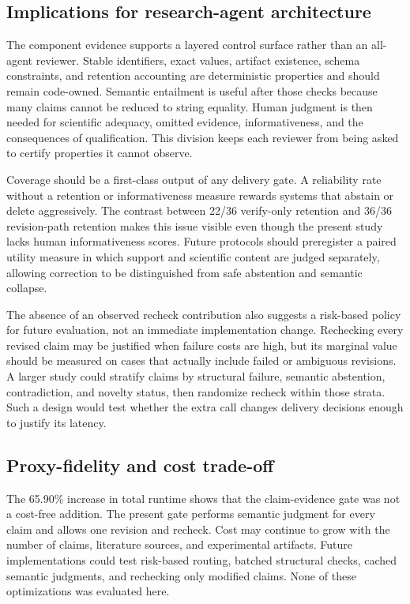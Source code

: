 \documentclass[11pt]{article}
\begin{document}
\subsection{Implications for research-agent architecture}

The component evidence supports a layered control surface rather than an all-agent reviewer. Stable identifiers, exact values, artifact existence, schema constraints, and retention accounting are deterministic properties and should remain code-owned. Semantic entailment is useful after those checks because many claims cannot be reduced to string equality. Human judgment is then needed for scientific adequacy, omitted evidence, informativeness, and the consequences of qualification. This division keeps each reviewer from being asked to certify properties it cannot observe.

Coverage should be a first-class output of any delivery gate. A reliability rate without a retention or informativeness measure rewards systems that abstain or delete aggressively. The contrast between 22/36 verify-only retention and 36/36 revision-path retention makes this issue visible even though the present study lacks human informativeness scores. Future protocols should preregister a paired utility measure in which support and scientific content are judged separately, allowing correction to be distinguished from safe abstention and semantic collapse.

The absence of an observed recheck contribution also suggests a risk-based policy for future evaluation, not an immediate implementation change. Rechecking every revised claim may be justified when failure costs are high, but its marginal value should be measured on cases that actually include failed or ambiguous revisions. A larger study could stratify claims by structural failure, semantic abstention, contradiction, and novelty status, then randomize recheck within those strata. Such a design would test whether the extra call changes delivery decisions enough to justify its latency.

\subsection{Proxy-fidelity and cost trade-off}

The 65.90\% increase in total runtime shows that the claim-evidence gate was not a cost-free addition. The present gate performs semantic judgment for every claim and allows one revision and recheck. Cost may continue to grow with the number of claims, literature sources, and experimental artifacts. Future implementations could test risk-based routing, batched structural checks, cached semantic judgments, and rechecking only modified claims. None of these optimizations was evaluated here.
\end{document}
